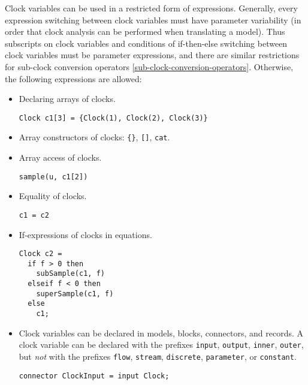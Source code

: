 Clock variables can be used in a restricted form of expressions.
Generally, every expression switching between clock variables must have parameter variability (in order that clock analysis can be performed when translating a model).
Thus subscripts on clock variables and conditions of if-then-else switching between clock variables must be parameter expressions, and there are similar restrictions for sub-clock conversion operators \cref{sub-clock-conversion-operators}.
Otherwise, the following expressions are allowed:
\begin{itemize}
\item
  Declaring arrays of clocks.
  \begin{example}
  \lstinline!Clock c1[3] = {Clock(1), Clock(2), Clock(3)}!
  \end{example}
\item
  Array constructors of clocks: \lstinline!{}!, \lstinline![]!, \lstinline!cat!.
\item
  Array access of clocks.
  \begin{example}
  \lstinline!sample(u, c1[2])!
  \end{example}
\item
  Equality of clocks.
  \begin{example}
  \lstinline!c1 = c2!
  \end{example}
\item
  If-expressions of clocks in equations.
  \begin{example}
\begin{lstlisting}[language=modelica]
Clock c2 =
  if f > 0 then
    subSample(c1, f)
  elseif f < 0 then
    superSample(c1, f)
  else
    c1;
\end{lstlisting}
  \lstinline!!
  \end{example}
\item
  Clock variables can be declared in models, blocks, connectors, and records.
  A clock variable can be declared with the prefixes \lstinline!input!, \lstinline!output!, \lstinline!inner!, \lstinline!outer!, but \emph{not} with the prefixes \lstinline!flow!, \lstinline!stream!, \lstinline!discrete!, \lstinline!parameter!, or \lstinline!constant!.
  \begin{example}
\begin{lstlisting}[language=modelica]
connector ClockInput = input Clock;
\end{lstlisting}
  \end{example}
\end{itemize}


